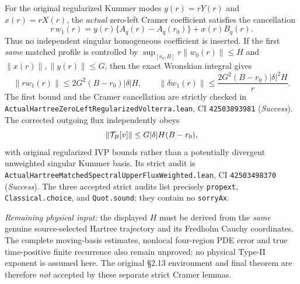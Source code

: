 \documentclass[11pt]{amsart}
\begin{document}
For the original regularized Kummer modes
$y(r)=rY(r)$ and $x(r)=rX(r)$,
the \emph{actual} zero-left Cramer coefficient satisfies the
cancellation
\[
 r\,w_1(r)
 =y(r)\{A_q(r)-A_q(r_0)\}+x(r)B_q(r).
\]
Thus no independent singular homogeneous coefficient is inserted.
If the first \emph{same} matched profile is controlled by
$\sup_{[r_0,B]}r\|w_0(r)\|\le H$ and
$\|x(r)\|,\|y(r)\|\le G$, then the exact Wronskian integral gives
\[
 \|r w_1(r)\|
  \le 2G^2(B-r_0)|\delta|H,\qquad
 \|\delta w_1(r)\|
  \le \frac{2G^2(B-r_0)|\delta|^2H}{r}.
\]
The first bound and the Cramer cancellation are strictly checked in
\texttt{ActualHartreeZeroLeftRegularizedVolterra.lean},
CI \texttt{42503893981} (\emph{Success}).
The corrected outgoing flux independently obeys
\[
 \left\|{\cal T}_{B}[v]\right\|
 \le G|\delta|H(B-r_0),
\]
with original regularized IVP bounds rather than a potentially
divergent unweighted singular Kummer basis.
Its strict audit is
\texttt{ActualHartreeMatchedSpectralUpperFluxWeighted.lean},
CI \texttt{42503498370} (\emph{Success}).
The three accepted strict audits list precisely
\texttt{propext}, \texttt{Classical.choice}, and
\texttt{Quot.sound}; they contain no \texttt{sorryAx}.

\emph{Remaining physical input:} the displayed $H$ must be
derived from the \emph{same} genuine source-selected Hartree trajectory
and its Fredholm Cauchy coordinates. The complete moving-basis estimates,
nonlocal four-region PDE error and true time-positive finite recurrence
also remain unproved; no physical Type-II exponent is assumed here.
The original §2.13 environment and final theorem are therefore
\emph{not} accepted by these separate strict Cramer lemmas.
\end{document}
